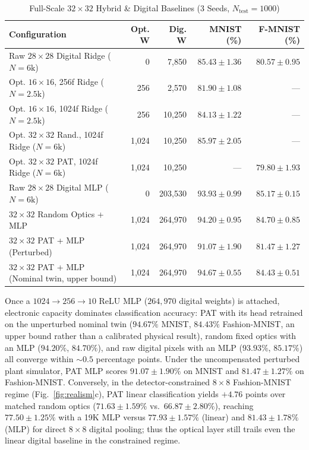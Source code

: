 \documentclass[journal]{IEEEtran}
\begin{document}
\begin{table}[!t]
  \centering
  \caption{Full-Scale $32\times 32$ Hybrid \& Digital Baselines (3 Seeds, $N_{\mathrm{test}}=1000$)}
  \label{tab:scaling}
  \begin{tabular}{@{}lrrrr@{}}
    \toprule
    \textbf{Configuration} & \textbf{Opt. W} & \textbf{Dig. W} & \textbf{MNIST (\%)} & \textbf{F-MNIST (\%)} \\
    \midrule
    Raw $28\times 28$ Digital Ridge ($N=6\text{k}$) & 0 & 7,850 & $85.43 \pm 1.36$ & $80.57 \pm 0.95$ \\
    Opt. $16\times 16$, 256f Ridge ($N=2.5\text{k}$) & 256 & 2,570 & $81.90 \pm 1.08$ & --- \\
    Opt. $16\times 16$, 1024f Ridge ($N=2.5\text{k}$) & 256 & 10,250 & $84.13 \pm 1.22$ & --- \\
    Opt. $32\times 32$ Rand., 1024f Ridge ($N=6\text{k}$) & 1,024 & 10,250 & $85.97 \pm 2.05$ & --- \\
    Opt. $32\times 32$ PAT, 1024f Ridge ($N=6\text{k}$) & 1,024 & 10,250 & --- & $79.80 \pm 1.93$ \\
    \midrule
    Raw $28\times 28$ Digital MLP ($N=6\text{k}$) & 0 & 203,530 & $93.93 \pm 0.99$ & $85.17 \pm 0.15$ \\
    $32\times 32$ Random Optics + MLP & 1,024 & 264,970 & $94.20 \pm 0.95$ & $84.70 \pm 0.85$ \\
    $32\times 32$ PAT + MLP (Perturbed) & 1,024 & 264,970 & $91.07 \pm 1.90$ & $81.47 \pm 1.27$ \\
    $32\times 32$ PAT + MLP (Nominal twin, upper bound) & 1,024 & 264,970 & $94.67 \pm 0.55$ & $84.43 \pm 0.51$ \\
    \bottomrule
  \end{tabular}
\end{table}

Once a $1024\to 256\to 10$ ReLU MLP ($264,970$ digital weights) is attached, electronic capacity dominates classification accuracy: PAT with its head retrained on the unperturbed nominal twin ($94.67\%$ MNIST, $84.43\%$ Fashion-MNIST, an upper bound rather than a calibrated physical result), random fixed optics with an MLP ($94.20\%$, $84.70\%$), and raw digital pixels with an MLP ($93.93\%$, $85.17\%$) all converge within $\sim 0.5$ percentage points. Under the uncompensated perturbed plant simulator, PAT MLP scores $91.07 \pm 1.90\%$ on MNIST and $81.47 \pm 1.27\%$ on Fashion-MNIST. Conversely, in the detector-constrained $8\times 8$ Fashion-MNIST regime (Fig.~\ref{fig:realism}c), PAT linear classification yields $+4.76$ points over matched random optics ($71.63 \pm 1.59\%$ vs.\ $66.87 \pm 2.80\%$), reaching $77.50 \pm 1.25\%$ with a 19K MLP versus $77.93 \pm 1.57\%$ (linear) and $81.43 \pm 1.78\%$ (MLP) for direct $8\times 8$ digital pooling; thus the optical layer still trails even the linear digital baseline in the constrained regime.
\end{document}
